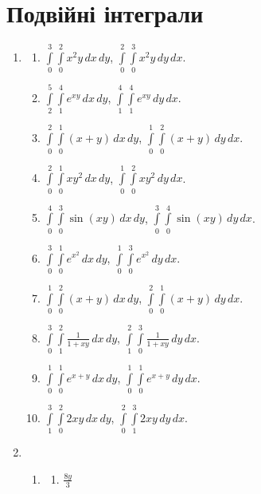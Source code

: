 \section{Подвійні інтеграли}
\begin{enumerate}
    \item
        \begin{multicols}{2}
            \begin{enumerate}[label*=\arabic*.]
                \item $\int\limits_0^3\int\limits_0^2 x^2y\,dx\,dy$, $\int\limits_0^2 \int\limits_0^3 x^2y\,dy\,dx$.
                \item $\int\limits_2^5\int\limits_1^4 e^{xy}\,dx\,dy$, $\int\limits_1^4 \int\limits_1^4 e^{xy}\,dy\,dx$.
                \item $\int\limits_0^2\int\limits_0^1 (x+y)\,dx\,dy$, $\int\limits_0^1 \int\limits_0^2 (x+y)\,dy\,dx$.
                \item $\int\limits_0^2\int\limits_0^1 xy^2\,dx\,dy$, $\int\limits_0^1 \int\limits_0^2 xy^2\,dy\,dx$.
                \item $\int\limits_0^4\int\limits_0^3 \sin(xy)\,dx\,dy$, $\int\limits_0^3 \int\limits_0^4 \sin(xy)\,dy\,dx$.
                \item $\int\limits_0^3\int\limits_0^1 e^{x^2}\,dx\,dy$, $\int\limits_0^1 \int\limits_0^3 e^{x^2}\,dy\,dx$.
                \item $\int\limits_0^1\int\limits_0^2 (x+y)\,dx\,dy$, $\int\limits_0^2 \int\limits_0^1 (x+y)\,dy\,dx$.
                \item $\int\limits_0^3\int\limits_1^2 \frac{1}{1+xy}\,dx\,dy$, $\int\limits_1^2 \int\limits_0^3 \frac{1}{1+xy}\,dy\,dx$.
                \item $\int\limits_0^1\int\limits_0^1 e^{x+y}\,dx\,dy$, $\int\limits_0^1 \int\limits_0^1 e^{x+y}\,dy\,dx$.
                \item $\int\limits_1^3\int\limits_0^2 2xy\,dx\,dy$, $\int\limits_0^2 \int\limits_1^3 2xy\,dy\,dx$.
            \end{enumerate}
        \end{multicols}
    \item \begin{enumerate}[label*=\arabic*.]
        \item\begin{multicols}{2}\begin{enumerate}[label=(\alph*)]
                        \item ${\frac{8 y}{3}}$

\end{enumerate}
\end{multicols}
\end{enumerate}
\end{enumerate}
